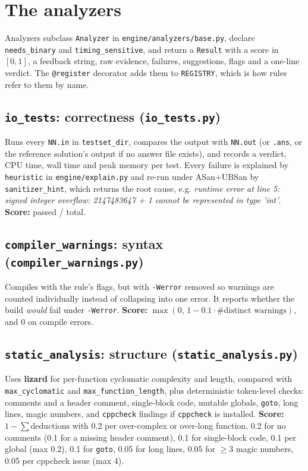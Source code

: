 \documentclass[11pt,a4paper]{article}
\newcommand{\file}[1]{\nolinkurl{#1}}
\newcommand{\fn}[1]{\nolinkurl{#1}}
\begin{document}
\section{The analyzers}
Analyzers subclass \fn{Analyzer} in \file{engine/analyzers/base.py}, declare \fn{needs_binary} and
\fn{timing_sensitive}, and return a \fn{Result} with a score in $[0,1]$, a feedback string, raw evidence,
failures, suggestions, flags and a one-line verdict. The \fn{@register} decorator adds them to
\fn{REGISTRY}, which is how rules refer to them by name.

\subsection{\texttt{io\_tests}: correctness (\texttt{io\_tests.py})}
Runs every \texttt{NN.in} in \texttt{testset\_dir}, compares the output with \texttt{NN.out} (or \texttt{.ans},
or the reference solution's output if no answer file exists), and records a verdict, CPU time, wall time and
peak memory per test. Every failure is explained by \fn{heuristic} in \file{engine/explain.py} and
re-run under ASan+UBSan by \fn{sanitizer_hint}, which returns the root cause, e.g.
\emph{runtime error at line 5: signed integer overflow: 2147483647 + 1 cannot be represented in type 'int'}.
\textbf{Score:} passed / total.

\subsection{\texttt{compiler\_warnings}: syntax (\texttt{compiler\_warnings.py})}
Compiles with the rule's flags, but with \texttt{-Werror} removed so warnings are counted individually instead
of collapsing into one error. It reports whether the build \emph{would} fail under \texttt{-Werror}.
\textbf{Score:} $\max(0,\,1 - 0.1 \cdot \#\text{distinct warnings})$, and 0 on compile errors.

\subsection{\texttt{static\_analysis}: structure (\texttt{static\_analysis.py})}
Uses \textbf{lizard} for per-function cyclomatic complexity and length, compared with
\texttt{max\_cyclomatic} and \texttt{max\_function\_length}, plus deterministic token-level checks: comments and a
header comment, single-block code, mutable globals, \texttt{goto}, long lines, magic numbers, and
\texttt{cppcheck} findings if \texttt{cppcheck} is installed.
\textbf{Score:} $1 - \sum \text{deductions}$ with 0.2 per over-complex or over-long function, 0.2 for no comments
(0.1 for a missing header comment), 0.1 for single-block code, 0.1 per global (max 0.2), 0.1 for \texttt{goto},
0.05 for long lines, 0.05 for $\ge 3$ magic numbers, 0.05 per cppcheck issue (max 4).
\end{document}
